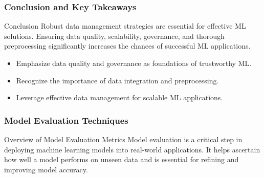 \documentclass{beamer}
\begin{document}
\begin{frame}[fragile]
    \frametitle{Conclusion and Key Takeaways}
    \begin{block}{Conclusion}
        Robust data management strategies are essential for effective ML solutions. Ensuring data quality, scalability, governance, and thorough preprocessing significantly increases the chances of successful ML applications.
    \end{block}
    
    \begin{itemize}
        \item Emphasize data quality and governance as foundations of trustworthy ML.
        \item Recognize the importance of data integration and preprocessing.
        \item Leverage effective data management for scalable ML applications.
    \end{itemize}
\end{frame}

\begin{frame}[fragile]
    \frametitle{Model Evaluation Techniques}
    \begin{block}{Overview of Model Evaluation Metrics}
        Model evaluation is a critical step in deploying machine learning models into real-world applications. It helps ascertain how well a model performs on unseen data and is essential for refining and improving model accuracy. 
    \end{block}
\end{frame}
\end{document}
